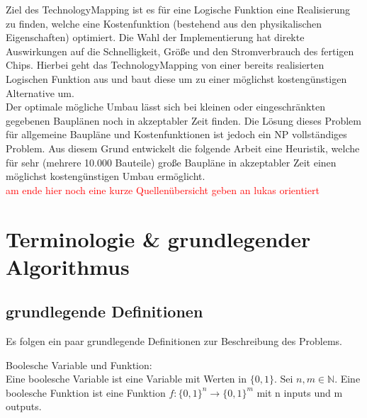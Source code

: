 \documentclass[11pt, a4paper, german]{article}
\newcommand{\TM}{TechnologyMapping }
\begin{document}
Ziel des \TM ist es für eine Logische Funktion eine Realisierung zu finden, welche eine Kostenfunktion (bestehend aus den physikalischen Eigenschaften) optimiert. Die Wahl der Implementierung hat direkte Auswirkungen auf die  Schnelligkeit, Größe und den Stromverbrauch des fertigen Chips. Hierbei geht das \TM von einer bereits realisierten Logischen Funktion aus und baut diese um zu einer möglichst kostengünstigen Alternative um. \\
Der optimale mögliche Umbau lässt sich bei kleinen oder eingeschränkten gegebenen Bauplänen noch in akzeptabler Zeit finden. Die Lösung dieses Problem für allgemeine Baupläne und Kostenfunktionen ist jedoch ein NP vollständiges Problem. Aus diesem Grund entwickelt die folgende Arbeit eine Heuristik, welche für sehr (mehrere 10.000 Bauteile) große Baupläne in akzeptabler Zeit einen möglichst kostengünstigen Umbau ermöglicht.\\
\textcolor{red}{am ende hier noch eine kurze Quellenübersicht geben an lukas orientiert}

\newpage

\section{Terminologie \& grundlegender Algorithmus}
\subsection{grundlegende Definitionen}
Es folgen ein paar grundlegende Definitionen zur Beschreibung des Problems.

\begin{definition}{Boolesche Variable und Funktion: } \\
Eine boolesche Variable ist eine Variable mit Werten in $ \{ 0 , 1 \} $.
Sei $ n, m \in \mathbb{N}$. Eine boolesche Funktion ist eine Funktion $ f : \{ 0 , 1 \}^n \rightarrow \{ 0 , 1 \}^m $ mit n inputs und m outputs. 
\end{definition}
\end{document}
